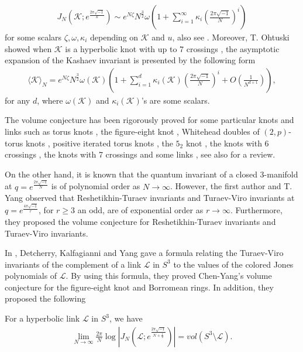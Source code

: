 \documentclass[12pt]{amsart}
\begin{document}
\begin{align} \label{formula-generalvolume}
    J_{N}(\mathcal{K};e^{\frac{2\pi\sqrt{-1}}{k}})\sim e^{N\zeta}N^{\frac{3}{2}}\omega\left(1+\sum_{i=1}^{\infty}\kappa_i\left(\frac{2\pi\sqrt{-1}}{N}\right)^i\right)
\end{align}
for some scalars $\zeta,\omega,\kappa_i$ depending on $\mathcal{K}$ and $u$, also see \cite{DGLZ09,GH08}. Moreover, T. Ohtuski showed when $\mathcal{K}$ is a hyperbolic knot with up to 7 crossings \cite{Oht16,OhtYok18,Oht17},  the asymptotic expansion of the Kashaev invariant is presented by the following form 
\begin{align} \label{formula-Kashaevexpansion}
    \langle \mathcal{K}\rangle_{N}=e^{N\zeta}N^{\frac{3}{2}}\omega(\mathcal{K})\left(1+\sum_{i=1}^d\kappa_i(\mathcal{K})\left(\frac{2\pi\sqrt{-1}}{N}\right)^i+O\left(\frac{1}{N^{d+1}}\right)\right),
\end{align}
for any $d$, where $\omega(\mathcal{K})$ and $\kappa_i(\mathcal{K})$'s are some scalars. 

The volume conjecture has been rigorously proved for some particular knots and links such as torus knots \cite{KT00,DKash07}, the figure-eight knot \cite{AndHan06}, Whitehead doubles of $(2,p)$-torus knots \cite{Zheng07}, positive iterated torus knots \cite{Van08}, the $5_2$ knot \cite{Oht16}, the knots with 6 crossings \cite{OhtYok18}, the knots with 7 crossings \cite{Oht17} and some links \cite{GL05,Van08,Van08-2,YY10,Zheng07}, see also \cite{Mur10} for a review. 

On the other hand, it is known that the quantum invariant of a closed 3-manifold at $q=e^{\frac{2\pi\sqrt{-1}}{N}}$ is of polynomial order as $N\rightarrow \infty$. However, the first author and T. Yang  \cite{CY18} observed that  Reshetikhin-Turaev invariants and Turaev-Viro invariants at $q=e^{\frac{4\pi\sqrt{-1}}{r}}$, for $r\geq 3$ an odd, are of exponential order as $r\rightarrow \infty$. Furthermore,  they proposed the volume conjecture for Reshetikhin-Turaev invariants and Turaev-Viro invariants. 

In \cite{DKY18},  Detcherry, Kalfagianni and Yang  gave a formula relating the Turaev-Viro invariants of the
complement of a link $\mathcal{L}$ in $S^3$ to the values of the colored Jones polynomials of $\mathcal{L}$. By using this formula, they proved Chen-Yang's volume conjecture \cite{CY18} for the figure-eight knot and Borromean rings.
In addition, they proposed the following 
\begin{conjecture} \label{conjecture-DKY}
    For a hyperbolic link $\mathcal{L}$ in $S^3$, we have
   \begin{align}
       \lim_{N\rightarrow \infty}\frac{2\pi}{N} \log|J_{N}(\mathcal{L}; e^{\frac{2\pi\sqrt{-1}}{N+\frac{1}{2}}})|=vol(S^3\setminus \mathcal{L}).
   \end{align} 
\end{conjecture}
\end{document}
